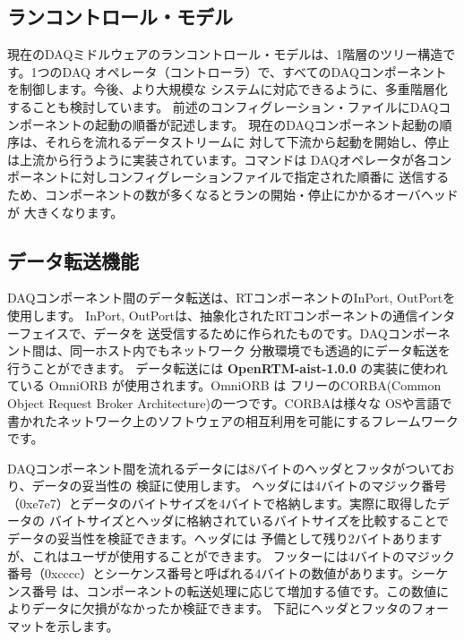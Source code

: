 \documentclass[a4j,10pt,dvips,onecolumn,oneside,final]{jarticle}%
\newcommand {\rtmcurrent} {
	{\bf OpenRTM-aist-1.0.0}
}
\begin{document}
\subsection{ランコントロール・モデル}\label{runctrl}
現在のDAQミドルウェアのランコントロール・モデルは、1階層のツリー構造です。1つのDAQ
オペレータ（コントローラ）で、すべてのDAQコンポーネントを制御します。今後、より大規模な
システムに対応できるように、多重階層化することも検討しています。
前述のコンフィグレーション・ファイルにDAQコンポーネントの起動の順番が記述します。
現在のDAQコンポーネント起動の順序は、それらを流れるデータストリームに
対して下流から起動を開始し、停止は上流から行うように実装されています。コマンドは
DAQオペレータが各コンポーネントに対しコンフィグレーションファイルで指定された順番に
送信するため、コンポーネントの数が多くなるとランの開始・停止にかかるオーバヘッドが
大きくなります。

\subsection{データ転送機能}\label{data-tarans}
DAQコンポーネント間のデータ転送は、RTコンポーネントのInPort, OutPortを使用します。
InPort, OutPortは、抽象化されたRTコンポーネントの通信インターフェイスで、データを
送受信するために作られたものです。DAQコンポーネント間は、同一ホスト内でもネットワーク
分散環境でも透過的にデータ転送を行うことができます。
データ転送には\rtmcurrent の実装に使われている OmniORB が使用されます。OmniORB は
フリーのCORBA(Common Object Request Broker Architecture)の一つです。CORBAは様々な
OSや言語で書かれたネットワーク上のソフトウェアの相互利用を可能にするフレームワークです。

DAQコンポーネント間を流れるデータには8バイトのヘッダとフッタがついており、データの妥当性の
検証に使用します。
ヘッダには4バイトのマジック番号（0xe7e7）とデータのバイトサイズを4バイトで格納します。実際に取得したデータの
バイトサイズとヘッダに格納されているバイトサイズを比較することでデータの妥当性を検証できます。ヘッダには
予備として残り2バイトありますが、これはユーザが使用することができます。
フッターには4バイトのマジック番号（0xcccc）とシーケンス番号と呼ばれる4バイトの数値があります。シーケンス番号
は、コンポーネントの転送処理に応じて増加する値です。この数値によりデータに欠損がなかったか検証できます。
下記にヘッダとフッタのフォーマットを示します。
\end{document}
